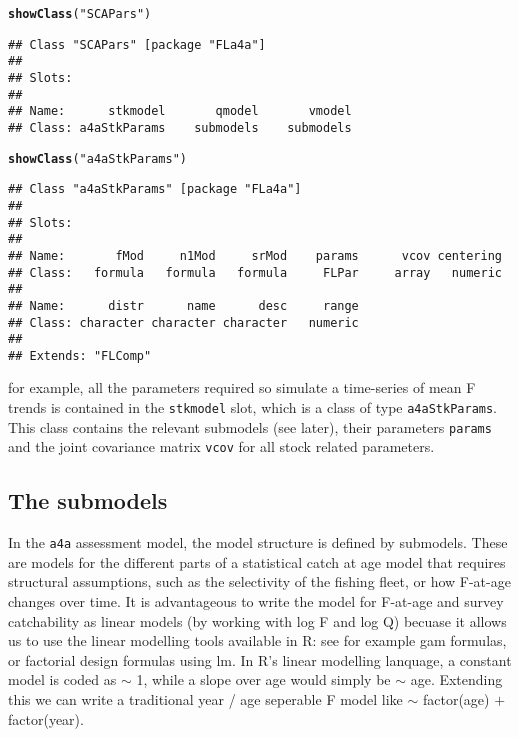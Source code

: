 \documentclass[a4paper,english,10pt]{article}\usepackage[]{graphicx}\usepackage[]{color}
\makeatletter
\newcommand{\hlstr}[1]{\textcolor[rgb]{0.192,0.494,0.8}{#1}}%
\newcommand{\hlstd}[1]{\textcolor[rgb]{0.345,0.345,0.345}{#1}}%
\newcommand{\hlkwd}[1]{\textcolor[rgb]{0.737,0.353,0.396}{\textbf{#1}}}%
\newenvironment{kframe}{%
 \def\at@end@of@kframe{}%
 \ifinner\ifhmode%
  \def\at@end@of@kframe{\end{minipage}}%
  \begin{minipage}{\columnwidth}%
 \fi\fi%
 \def\FrameCommand##1{\hskip\@totalleftmargin \hskip-\fboxsep
 \colorbox{shadecolor}{##1}\hskip-\fboxsep
     \hskip-\linewidth \hskip-\@totalleftmargin \hskip\columnwidth}%
 \MakeFramed {\advance\hsize-\width
   \@totalleftmargin\z@ \linewidth\hsize
   \@setminipage}}%
 {\par\unskip\endMakeFramed%
 \at@end@of@kframe}
\newenvironment{knitrout}{}{} %
\makeatother
\begin{document}
\begin{knitrout}
\color{fgcolor}\begin{kframe}
\begin{alltt}
\hlkwd{showClass}\hlstd{(}\hlstr{"SCAPars"}\hlstd{)}
\end{alltt}
\begin{verbatim}
## Class "SCAPars" [package "FLa4a"]
## 
## Slots:
##                                              
## Name:      stkmodel       qmodel       vmodel
## Class: a4aStkParams    submodels    submodels
\end{verbatim}
\begin{alltt}
\hlkwd{showClass}\hlstd{(}\hlstr{"a4aStkParams"}\hlstd{)}
\end{alltt}
\begin{verbatim}
## Class "a4aStkParams" [package "FLa4a"]
## 
## Slots:
##                                                                   
## Name:       fMod     n1Mod     srMod    params      vcov centering
## Class:   formula   formula   formula     FLPar     array   numeric
##                                               
## Name:      distr      name      desc     range
## Class: character character character   numeric
## 
## Extends: "FLComp"
\end{verbatim}
\end{kframe}
\end{knitrout}


for example, all the parameters required so simulate a time-series of mean F trends is contained in the \texttt{stkmodel} slot, which is a class of type \texttt{a4aStkParams}.  This class contains the relevant submodels (see later), their parameters \texttt{params} and the joint covariance matrix \texttt{vcov} for all stock related parameters.

\subsection{The submodels}

In the \texttt{a4a} assessment model, the model structure is defined by submodels.  These are models for the different parts of a statistical catch at age model that requires structural assumptions, such as the selectivity of the fishing fleet, or how F-at-age changes over time.  It is advantageous to write the model for F-at-age and survey catchability as linear models (by working with log F and log Q) becuase it allows us to use the linear modelling tools available in R:  see for example gam formulas, or factorial design formulas using lm.  In R's linear modelling lanquage, a constant model is coded as $\sim$ 1, while a slope over age would simply be $\sim$ age.  Extending this we can write a traditional year / age seperable F model like $\sim$ factor(age) $+$ factor(year).
\end{document}
